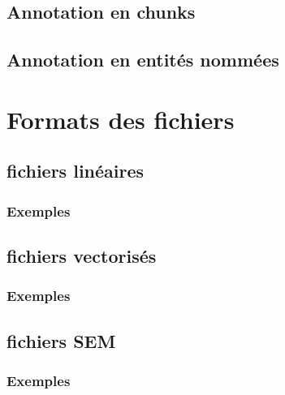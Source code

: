 \documentclass[12pt]{article}
\begin{document}
        \subsection{Annotation en chunks}
        

        \subsection{Annotation en entités nommées}
        

        \subsection{\LeFFFFull}
        
    
    \section{Formats des fichiers}
    

        \subsection{fichiers linéaires}
        

            \subsubsection{Exemples}
            

        \subsection{fichiers vectorisés}
        

            \subsubsection{Exemples}
            

        \subsection{fichiers SEM}
        

            \subsubsection{Exemples}
            
    
\end{document}
